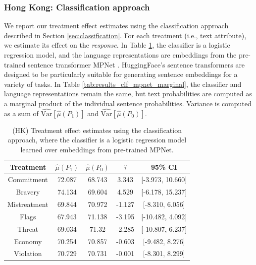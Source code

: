\documentclass{article}
\begin{document}
\subsubsection{Hong Kong: Classification approach}

We report our treatment effect estimates using the classification approach described in Section \ref{sec:classification}. For each treatment (i.e., text attribute), we estimate its effect on the \textit{response}. In Table \ref{tab:results_clf_mpnet}, the classifier is a logistic regression model, and the language representations are embeddings from the pre-trained sentence transformer MPNet \cite{song2020mpnet}. HuggingFace's sentence transformers are designed to be particularly suitable for generating sentence embeddings for a variety of tasks. In Table \ref{tab:results_clf_mpnet_marginal}, the classifier and language representations remain the same, but text probabilities are computed as a marginal product of the individual sentence probabilities. Variance is computed as a sum of $\widehat{\text{Var}}[\hat{\mu}(P_1)]$ and $\widehat{\text{Var}}[\hat{\mu}(P_0)]$.

\begin{table}[!ht]
    \centering
    \begin{tabular}{c|cccc}
        \toprule
        Treatment & $\hat{\mu}(P_1)$ & $\hat{\mu}(P_0)$ & $\hat{\tau}$ & 95\% CI \\
        \midrule
        Commitment & 72.087 & 68.743 & \textcolor{green!50!black}{3.343} & [-3.973, 10.660] \\
        Bravery & 74.134 & 69.604 & \textcolor{green!50!black}{4.529} & [-6.178, 15.237] \\
        Mistreatment & 69.844 & 70.972 & \textcolor{red!80!black}{-1.127} & [-8.310, 6.056] \\
        Flags & 67.943 & 71.138 & \textcolor{red!80!black}{-3.195} & [-10.482, 4.092] \\
        Threat & 69.034 & 71.32 & \textcolor{red!80!black}{-2.285} & [-10.807, 6.237]  \\
        Economy & 70.254 & 70.857 & \textcolor{red!80!black}{-0.603} & [-9.482, 8.276] \\
        Violation & 70.729 & 70.731 & \textcolor{red!80!black}{-0.001} & [-8.301, 8.299] \\
        \bottomrule
    \end{tabular}
    \caption{(HK) Treatment effect estimates using the classification approach, where the classifier is a logistic regression model learned over embeddings from pre-trained MPNet.}
    \label{tab:results_clf_mpnet}
\end{table}
\end{document}
